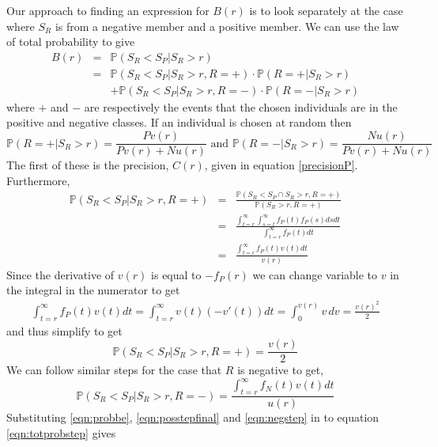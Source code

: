 \documentclass[preprint,12pt]{article}
\newcommand{\prob}{\mathbb{P}}  %
\begin{document}
Our approach to finding an expression for $B(r)$ is to look separately at the case where $S_R$ is from a negative member and a positive member. We can use the law of total probability to give 
\begin{eqnarray}
B(r) &= &\prob(S_R < S_P | S_R>r) \nonumber \\
& = & \prob(S_R < S_P | S_{R} > r , R = + ) \cdot \prob( R = + | S_R > r )  \nonumber \\
&&  + \prob(S_R < S_P | S_R>r, R= - ) \cdot \prob( R = - | S_R>r ) \label{eqn:totprobstep} 
\end{eqnarray}
where $+$ and $-$ are respectively the events that the chosen individuals are in the positive and negative classes. If an individual is chosen at random then 
\begin{equation}
\prob( R = + | S_R>r ) =   \frac{P v(r)}{P v(r) + N u(r)}  \mbox{ and }  \prob( R = - | S_R>r ) =   \frac{N u(r)}{P v(r) + N u(r)} \label{eqn:probbe}
\end{equation}
The first of these is the precision, $C(r)$, given in equation \ref{precisionP}. Furthermore,
\begin{eqnarray}
\prob(S_R < S_P | S_{R} > r ,  R = +   ) & = & \frac{\prob(S_R < S_P \cap S_{R} > r ,  R = +  )}{\prob(S_{R} > r ,  R = +  )} \nonumber \\
& = & \frac{\int_{t=r}^\infty \int_{s=t}^\infty f_P(t) f_P(s) ds dt}{\int_{t=r}^\infty f_P(t) dt} \nonumber \\
& = & \frac{\int_{t=r}^\infty f_P(t) v(t) dt}{v(r)} \label{eqn:posstep}
\end{eqnarray}
Since the derivative of $v(r)$ is equal to $-f_P(r)$ we can change variable to $v$ in the integral in the numerator to get
 \begin{eqnarray}
\int_{t=r}^\infty f_P(t) v(t) dt =  \int_{t=r}^\infty v(t) \left( -v'(t) \right) dt = \int_{0}^{v(r)} v \, dv = \frac{v(r)^2}{2}
\end{eqnarray}
and thus simplify to get
\begin{equation}
\prob(S_R < S_P | S_{R} > r ,  R = +   ) = \frac{v(r)}{2} \label{eqn:posstepfinal}
\end{equation}
We can follow similar steps for the case that $R$ is negative to get,
\begin{equation}
\prob(S_R < S_P | S_{R} > r ,  R = -   ) = \frac{\int_{t=r}^\infty f_N(t) v(t) dt}{u(r)}  \label{eqn:negstep}
\end{equation}
Substituting \ref{eqn:probbe}, \ref{eqn:posstepfinal} and \ref{eqn:negstep} in to equation \ref{eqn:totprobstep} gives
\end{document}
